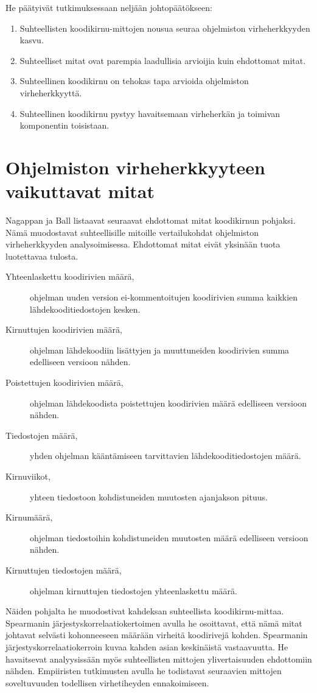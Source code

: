 \documentclass[finnish]{../tktltiki2}
\theoremstyle{definition}
\theoremstyle{remark}
\begin{document}
\noindent He päätyivät tutkimuksessaan neljään johtopäätökseen:

\begin{enumerate}
    \item Suhteellisten koodikirnu-mittojen nousua seuraa ohjelmiston virheherkkyyden kasvu.
    \item Suhteelliset mitat ovat parempia laadullisia arvioijia kuin ehdottomat mitat.
    \item Suhteellinen koodikirnu on tehokas tapa arvioida ohjelmiston virheherkkyyttä.
    \item Suhteellinen koodikirnu pystyy havaitsemaan virheherkän ja toimivan komponentin toisistaan.
\end{enumerate}

\section{Ohjelmiston virheherkkyyteen vaikuttavat mitat}

Nagappan ja Ball listaavat seuraavat ehdottomat mitat koodikirnun pohjaksi. Nämä muodostavat suhteellisille mitoille vertailukohdat ohjelmiston virheherkkyyden analysoimisessa. Ehdottomat mitat eivät yksinään tuota luotettavaa tulosta.

\begin{description}
    \item[Yhteenlaskettu koodirivien määrä,] ohjelman uuden version ei-kommen\-toitujen koodirivien summa kaikkien lähdekooditiedostojen kesken.
    \item[Kirnuttujen koodirivien määrä,] ohjelman lähdekoodiin lisättyjen ja muuttuneiden koodirivien summa edelliseen versioon nähden.
    \item[Poistettujen koodirivien määrä,] ohjelman lähdekoodista poistettujen koodirivien määrä edelliseen versioon nähden.
    \item[Tiedostojen määrä,] yhden ohjelman kääntämiseen tarvittavien lähdekoodi\-tiedostojen määrä.
    \item[Kirnuviikot,] yhteen tiedostoon kohdistuneiden muutosten ajanjakson pituus.
    \item[Kirnumäärä,] ohjelman tiedostoihin kohdistuneiden muutosten määrä edelliseen versioon nähden.
    \item[Kirnuttujen tiedostojen määrä,] ohjelman kirnuttujen tiedostojen yhteenlaskettu määrä.
\end{description}

Näiden pohjalta he muodostivat kahdeksan suhteellista koodikirnu-mittaa. Spearmanin järjestyskorrelaatiokertoimen avulla he osoittavat, että nämä mitat johtavat selvästi kohonneeseen määrään virheitä koodirivejä kohden. Spearmanin järjestyskorrelaatiokerroin kuvaa kahden asian keskinäistä vastaavuutta. He havaitsevat analyysissään myös suhteellisten mittojen ylivertaisuuden ehdottomiin nähden. Empiiristen tutkimusten avulla he todistavat seuraavien mittojen soveltuvuuden todellisen virhetiheyden ennakoimiseen.
\end{document}
